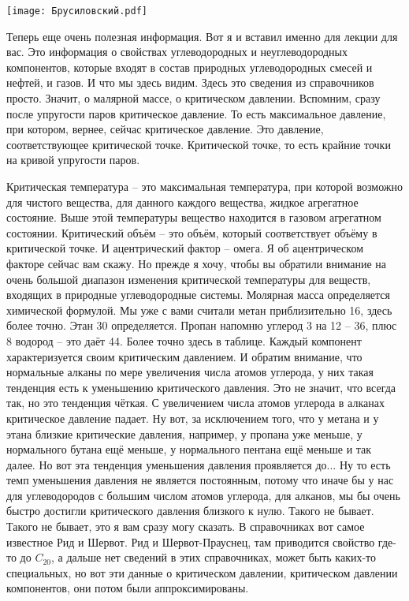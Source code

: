 \documentclass[main.tex]{subfiles}
\begin{document}
\begin{center}
\texttt{[image: Брусиловский.pdf]}
\end{center}

Теперь еще очень полезная информация.
Вот я и вставил именно для лекции для вас.
Это информация о свойствах углеводородных и неуглеводородных компонентов, которые входят в состав природных углеводородных смесей и нефтей, и газов.
И что мы здесь видим.
Здесь это сведения из справочников просто.
Значит, о малярной массе, о критическом давлении.
Вспомним, сразу после упругости паров критическое давление.
То есть максимальное давление, при котором, вернее, сейчас
критическое давление.
Это давление, соответствующее критической точке.
Критической точке, то есть крайние точки на кривой упругости паров.

Критическая температура -- это максимальная температура, при которой возможно для чистого вещества, для данного каждого вещества, жидкое агрегатное состояние.
Выше этой температуры вещество находится в газовом агрегатном состоянии.
Критический объём -- это объём, который соответствует объёму в критической точке.
И ацентрический фактор -- омега.
Я об ацентрическом факторе сейчас вам скажу.
Но прежде я хочу, чтобы вы обратили внимание на очень большой диапазон изменения критической температуры для веществ, входящих в природные углеводородные системы.
Молярная масса определяется химической формулой.
Мы уже с вами считали метан приблизительно 16, здесь более точно.
Этан 30 определяется.
Пропан напомню углерод 3 на 12 -- 36, плюс 8 водород -- это даёт 44.
Более точно здесь в таблице.
Каждый компонент характеризуется своим критическим давлением.
И обратим внимание, что нормальные алканы по мере увеличения числа атомов углерода, у них такая тенденция есть к уменьшению критического давления.
Это не значит, что всегда так, но это тенденция чёткая.
С увеличением числа атомов углерода в алканах критическое давление падает.
Ну вот, за исключением того, что у метана и у этана близкие критические давления, например, у пропана уже меньше, у нормального бутана ещё меньше, у нормального пентана ещё меньше и так далее.
Но вот эта тенденция уменьшения давления проявляется до...
Ну то есть темп уменьшения давления не является постоянным, потому что иначе бы у нас для углеводородов с большим числом атомов углерода, для алканов, мы бы очень быстро достигли критического давления близкого к нулю.
Такого не бывает.
Такого не бывает, это я вам сразу могу сказать.
В справочниках вот самое известное Рид и Шервот.
Рид и Шервот-Прауснец, там приводится свойство где-то до $C_{20}$, а дальше нет сведений в этих справочниках, может быть каких-то специальных, но вот эти данные о критическом давлении, критическом давлении компонентов, они потом были аппроксимированы.
\end{document}
